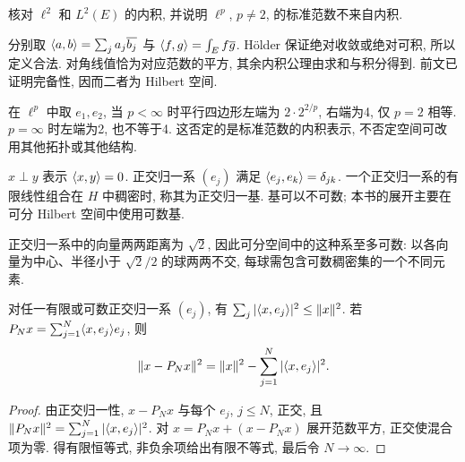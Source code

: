 \begin{example}\label{legacy:ch06:example1}
核对 $\ell^2$ 和 $L^2(E)$ 的内积, 并说明 $\ell^p$, $p\ne2$, 的标准范数不来自内积.
\end{example}
\begin{solution}
分别取 $\langle a,b\rangle=\sum_ja_j\overline{b_j}$ 与 $\langle f,g\rangle=\int_Ef\overline g$. Hölder 保证绝对收敛或绝对可积, 所以定义合法. 对角线值恰为对应范数的平方, 其余内积公理由求和与积分得到. 前文已证明完备性, 因而二者为 Hilbert 空间.

在 $\ell^p$ 中取 $e_1,e_2$, 当 $p<\infty$ 时平行四边形左端为 $2\cdot2^{2/p}$, 右端为4, 仅 $p=2$ 相等. $p=\infty$ 时左端为2, 也不等于4. 这否定的是标准范数的内积表示, 不否定空间可改用其他拓扑或其他结构.
\end{solution}

\begin{definition}
$x\perp y$ 表示 $\langle x,y\rangle=0$. 正交归一系 $(e_j)$ 满足 $\langle e_j,e_k\rangle=\delta_{jk}$. 一个正交归一系的有限线性组合在 $H$ 中稠密时, 称其为正交归一基. 基可以不可数; 本书的展开主要在可分 Hilbert 空间中使用可数基.
\end{definition}
正交归一系中的向量两两距离为 $\sqrt2$, 因此可分空间中的这种系至多可数: 以各向量为中心、半径小于 $\sqrt2/2$ 的球两两不交, 每球需包含可数稠密集的一个不同元素.

\begin{theorem}\label{thm:bessel}
对任一有限或可数正交归一系 $(e_j)$, 有 $\sum_j|\langle x,e_j\rangle|^2\le\lVert x\rVert^2$. 若 $P_Nx=\sum_{j=1}^N\langle x,e_j\rangle e_j$, 则
\[
\lVert x-P_Nx\rVert^2=\lVert x\rVert^2-\sum_{j=1}^N|\langle x,e_j\rangle|^2.
\]
\end{theorem}
\begin{proof}
由正交归一性, $x-P_Nx$ 与每个 $e_j$, $j\le N$, 正交, 且 $\lVert P_Nx\rVert^2=\sum_{j=1}^N|\langle x,e_j\rangle|^2$. 对 $x=P_Nx+(x-P_Nx)$ 展开范数平方, 正交使混合项为零. 得有限恒等式, 非负余项给出有限不等式, 最后令 $N\to\infty$.
\end{proof}

